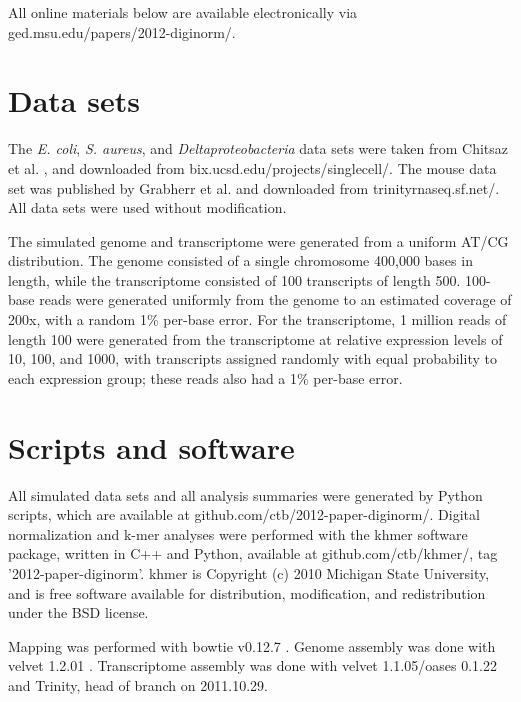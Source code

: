 \documentclass{pnastwo}
\begin{document}
\begin{article}

\begin{materials}

All online materials below are available electronically via
ged.msu.edu/papers/2012-diginorm/.

\section{Data sets}

The {\em E. coli}, {\em S. aureus}, and {\em Deltaproteobacteria} data
sets were taken from Chitsaz et al. \cite{pubmed21926975}, and
downloaded from bix.ucsd.edu/projects/singlecell/.  The
mouse data set was published by Grabherr et al. \cite{pubmed21572440}
and downloaded from trinityrnaseq.sf.net/.  All data sets
were used without modification.

The simulated genome and transcriptome were generated from a uniform
AT/CG distribution.  The genome consisted of a single chromosome
400,000 bases in length, while the transcriptome consisted of 100
transcripts of length 500.  100-base reads were generated uniformly
from the genome to an estimated coverage of 200x, with a random 1\%
per-base error.  For the transcriptome, 1 million reads of length 100
were generated from the transcriptome at relative expression levels of
10, 100, and 1000, with transcripts assigned randomly with equal
probability to each expression group; these reads also had a 1\%
per-base error.

\section{Scripts and software}

All simulated data sets and all analysis summaries were generated by
Python scripts, which are available at 
  github.com/ctb/2012-paper-diginorm/.  Digital normalization
and k-mer analyses were performed with the khmer software package,
written in C++ and Python, available at 
  github.com/ctb/khmer/, tag '2012-paper-diginorm'.  khmer is
Copyright (c) 2010 Michigan State University, and is free software
available for distribution, modification, and redistribution under the
BSD license.

Mapping was performed with bowtie v0.12.7 \cite{pubmed19261174}.
Genome assembly was done with velvet 1.2.01 \cite{pubmed18349386}.
Transcriptome assembly was done with velvet 1.1.05/oases 0.1.22 and
Trinity, head of branch on 2011.10.29.


\end{materials}
\end{article}
\end{document}

